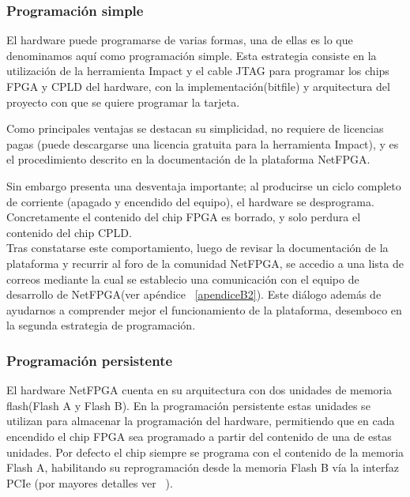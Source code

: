 
\subsubsection{Programaci\'on simple}
El hardware puede programarse de varias formas, una de ellas es lo que denominamos aqu\'i como programaci\'on simple. Esta estrategia consiste en la utilizaci\'on de la herramienta Impact y el cable JTAG para programar los chips FPGA y CPLD del hardware, con la implementaci\'on(bitfile) y arquitectura del proyecto con que se quiere programar la tarjeta.

Como principales ventajas se destacan su simplicidad, no requiere de licencias pagas (puede descargarse una licencia gratuita para la herramienta Impact), y es el procedimiento descrito en la documentaci\'on de la plataforma NetFPGA.

Sin embargo presenta una desventaja importante; al producirse un ciclo completo de corriente (apagado y encendido del equipo), el hardware se desprograma. Concretamente el contenido del chip FPGA es borrado, y solo perdura el contenido del chip CPLD.\\

Tras constatarse este comportamiento, luego de revisar la documentaci\'on de la plataforma y recurrir al foro de la comunidad NetFPGA, se accedio a una lista de correos mediante la cual se establecio una comunicaci\'on con el equipo de desarrollo de NetFPGA(ver ap\'endice ~\ref{apendiceB2}). Este di\'alogo adem\'as de ayudarnos a comprender mejor el funcionamiento de la plataforma, desemboco en la segunda estrategia de programaci\'on.

\subsubsection{Programaci\'on persistente}
El hardware NetFPGA cuenta en su arquitectura con dos unidades de memoria flash(Flash A y Flash B). En la programaci\'on persistente estas unidades se utilizan para almacenar la programaci\'on del hardware, permitiendo que en cada encendido el chip FPGA sea programado a partir del contenido de una de estas unidades. Por defecto el chip siempre se programa con el contenido de la memoria Flash A, habilitando su reprogramaci\'on desde la memoria Flash B v\'ia la interfaz PCIe (por mayores detalles ver ~\citep{PCIEProgProject}).\\

